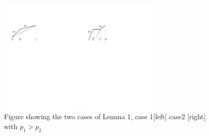 \begin{figure}[htb]
\begin{minipage}[b]{0.48\linewidth}
  \centering
  \centerline{\includegraphics[width=4cm]{Lemma1_case1.pdf}}
\end{minipage}
\begin{minipage}[b]{0.48\linewidth}
  \centering
  \centerline{\includegraphics[width=4cm]{Lemma1_case2.pdf}}
\end{minipage}
\caption{Figure showing the two cases of Lemma 1, case 1[left] case2 [right] with $p_1>p_2$}
\label{Lemma1}
\end{figure}

